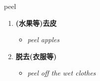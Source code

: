 
\begin{frame}
{\huge peel}
\begin{center}
\begin{enumerate}\Large
  \item \textbf{(水果等)去皮}
  \begin{itemize}
    \item \em{\Large{peel apples}}
  \end{itemize}
  \item \textbf{脱去(衣服等)}
  \begin{itemize}
    \item \em{\Large{peel off the wet clothes}}
  \end{itemize}
\end{enumerate}
\end{center}
\end{frame}
